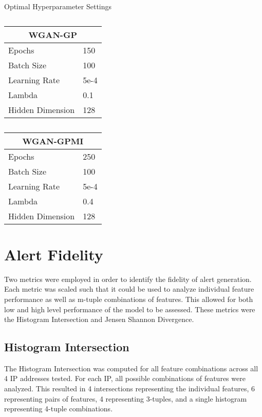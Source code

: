 \begin{table}[!htb]
	\centering
	\caption{Optimal Hyperparameter Settings}
	\label{tab:params}
	\begin{subtable}{.5\linewidth}
		\centering
		\caption{}
		\begin{tabular}{l|l}
			\hline
			\multicolumn{2}{c}{\textbf{WGAN-GP}} \\
			\hline
			Epochs & 150 \\
			Batch Size & 100 \\
			Learning Rate & 5e-4 \\
			Lambda & 0.1 \\
			Hidden Dimension & 128
		\end{tabular}
	\end{subtable}%
	\begin{subtable}{.5\linewidth}
		\centering
		\caption{}
		\begin{tabular}{l|l}
			\hline
			\multicolumn{2}{c}{\textbf{ WGAN-GPMI}} \\
			\hline
			Epochs & 250 \\
			Batch Size & 100 \\
			Learning Rate & 5e-4 \\
			Lambda & 0.4 \\
			Hidden Dimension & 128
		\end{tabular}
	\end{subtable}%
\end{table}

\section{Alert Fidelity}
\label{sec:fidel}

Two metrics were employed in order to identify the fidelity of alert generation. Each metric was scaled such that it could be used to analyze individual feature performance as well as m-tuple combinations of features. This allowed for both low and high level performance of the model to be assessed. These metrics were the Histogram Intersection and Jensen Shannon Divergence.

\subsection{Histogram Intersection}
\label{sec:inter}

The Histogram Intersection was computed for all feature combinations across all 4 IP addresses tested. For each IP, all possible combinations of features were analyzed. This resulted in 4 intersections representing the individual features, 6 representing pairs of features, 4 representing 3-tuples, and a single histogram representing 4-tuple combinations.

